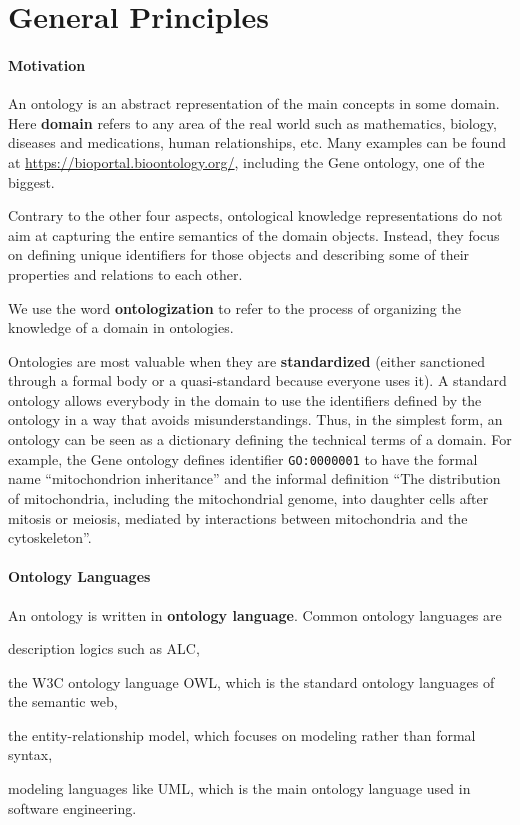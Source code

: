 \section{General Principles}\label{sec:onto:principles}

\paragraph{Motivation}
An ontology is an abstract representation of the main concepts in some domain.
Here \textbf{domain} refers to any area of the real world such as mathematics, biology, diseases and medications, human relationships, etc.
Many examples can be found at \url{https://bioportal.bioontology.org/}, including the Gene ontology, one of the biggest.

Contrary to the other four aspects, ontological knowledge representations do not aim at capturing the entire semantics of the domain objects.
Instead, they focus on defining unique identifiers for those objects and describing some of their properties and relations to each other.

We use the word \textbf{ontologization} to refer to the process of organizing the knowledge of a domain in ontologies.

Ontologies are most valuable when they are \textbf{standardized} (either sanctioned through a formal body or a quasi-standard because everyone uses it).
A standard ontology allows everybody in the domain to use the identifiers defined by the ontology in a way that avoids misunderstandings.
Thus, in the simplest form, an ontology can be seen as a dictionary defining the technical terms of a domain.
For example, the Gene ontology defines identifier \texttt{GO:0000001} to have the formal name \enquote{mitochondrion inheritance} and the informal definition \enquote{The distribution of mitochondria, including the mitochondrial genome, into daughter cells after mitosis or meiosis, mediated by interactions between mitochondria and the cytoskeleton}.

\paragraph{Ontology Languages}
An ontology is written in \textbf{ontology language}.
Common ontology languages are
\begin{compactitem}
 \item description logics such as ALC,
 \item the W3C ontology language OWL, which is the standard ontology languages of the semantic web,
 \item the entity-relationship model, which focuses on modeling rather than formal syntax,
 \item modeling languages like UML, which is the main ontology language used in software engineering.
\end{compactitem}

